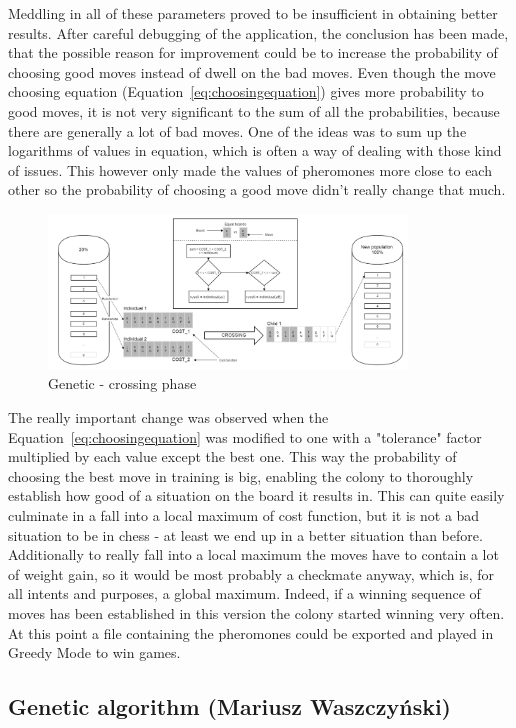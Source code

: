 \documentclass[pdftex]{article}
\begin{document}
Meddling in all of these parameters proved to be insufficient in obtaining better results. After careful debugging of the application, the conclusion has been made, that the possible reason for improvement could be to increase the probability of choosing good moves instead of dwell on the bad moves. Even though the move choosing equation (Equation~\ref{eq:choosingequation}) gives more probability to good moves, it is not very significant to the sum of all the probabilities, because there are generally a lot of bad moves. One of the ideas was to sum up the logarithms of values in equation, which is often a way of dealing with those kind of issues. This however only made the values of pheromones more close to each other so the probability of choosing a good move didn't really change that much. 
\begin{figure}[!htb]
	\centering
	\includegraphics[width=0.85\textwidth]{genetic/genetic_crossing.png} 
	\caption{Genetic - crossing phase}
	\label{fig:genetic_crossing}
\end{figure}
The really important change was observed when the Equation~\ref{eq:choosingequation} was modified to one with a "tolerance" factor multiplied by each value except the best one. This way the probability of choosing the best move in training is big, enabling  the colony to thoroughly establish how good of a situation on the board it results in. This can quite easily culminate in a fall into a local maximum of cost function, but it is not a bad situation to be in chess - at least we end up in a better situation than before. Additionally to really fall into a local maximum the moves have to contain a lot of weight gain, so it would be most probably a checkmate anyway, which is, for all intents and purposes, a global maximum. Indeed, if a winning sequence of moves has been established in this version the colony started winning very often. At this point a file containing the pheromones could be exported and played in Greedy Mode to win games. 

\subsection{Genetic algorithm (Mariusz Waszczyński)}
\label{sec:genetic}
\end{document}
